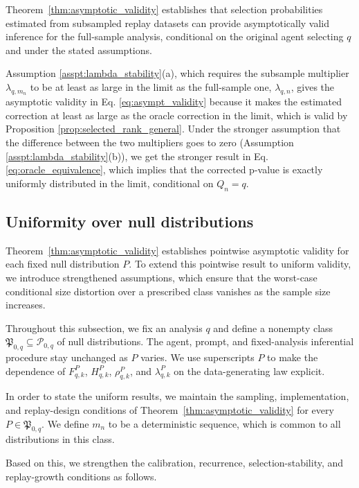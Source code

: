 \documentclass[10pt]{article}
\begin{document}
Theorem~\ref{thm:asymptotic_validity} establishes that selection probabilities estimated from subsampled replay datasets can provide asymptotically valid inference for the full-sample analysis, conditional on the original agent selecting $q$ and under the stated assumptions.

Assumption \ref{asspt:lambda_stability}(a), which requires the subsample multiplier $\lambda_{q,m_n}$ to be at least as large in the limit as the full-sample one, $\lambda_{q,n}$, gives the asymptotic validity in Eq. \eqref{eq:asympt_validity} because it makes the estimated correction at least as large as the oracle correction in the limit, which is valid by Proposition \ref{prop:selected_rank_general}. Under the stronger assumption that the difference between the two multipliers goes to zero (Assumption \ref{asspt:lambda_stability}(b)), we get the stronger result in Eq. \eqref{eq:oracle_equivalence}, which implies that the corrected p-value is exactly uniformly distributed in the limit, conditional on $Q_n = q$.

\subsection{Uniformity over null distributions}
\label{sec:uniformity}
Theorem~\ref{thm:asymptotic_validity} establishes pointwise asymptotic validity for each fixed null distribution $P$. To extend this pointwise result to uniform validity, we introduce strengthened assumptions, which ensure that the worst-case conditional size distortion over a prescribed class vanishes as the sample size increases.

Throughout this subsection, we fix an analysis $q$ and define a nonempty class $\mathfrak P_{0,q}\subseteq\mathcal P_{0,q}$ of null distributions. The agent, prompt, and fixed-analysis inferential procedure stay unchanged as $P$ varies. We use superscripts $P$ to make the dependence of $F^P_{q,k}$, $H^P_{q,k}$, $\rho^P_{q,k}$, and $\lambda^P_{q,k}$ on the data-generating law explicit.

In order to state the uniform results, we maintain the sampling, implementation, and replay-design conditions of Theorem~\ref{thm:asymptotic_validity} for every $P\in\mathfrak P_{0,q}$. We define $m_n$ to be a deterministic sequence, which is common to all distributions in this class.

Based on this, we strengthen the calibration, recurrence, selection-stability, and replay-growth conditions as follows.
\end{document}
